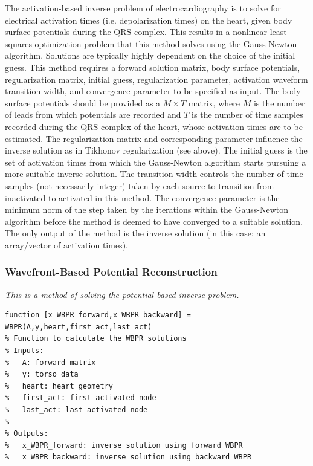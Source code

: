 The activation-based inverse problem of electrocardiography is to solve for electrical activation times (i.e. depolarization times) on the heart, given body surface potentials during the QRS complex. This results in a nonlinear least-squares optimization problem that this method solves using the Gauss-Newton algorithm. Solutions are typically highly dependent on the choice of the initial guess. This method requires a forward solution matrix, body surface potentials, regularization matrix, initial guess, regularization parameter, activation waveform transition width, and convergence parameter to be specified as input. The body surface potentials should be provided as a $M \times T$ matrix, where $M$ is the number of leads from which potentials are recorded and $T$ is the number of time samples recorded during the QRS complex of the heart, whose activation times are to be estimated. The regularization matrix and corresponding parameter influence the inverse solution as in Tikhonov regularization (see above). The initial guess is the set of activation times from which the Gauss-Newton algorithm starts pursuing a more suitable inverse solution. The transition width controls the number of time samples (not necessarily integer) taken by each source to transition from inactivated to activated in this method. The convergence parameter is the minimum norm of the step taken by the iterations within the Gauss-Newton algorithm before the method is deemed to have converged to a suitable solution. The only output of the method is the inverse solution (in this case: an array/vector of activation times).

\subsubsection{Wavefront-Based Potential Reconstruction}

\vspace{5pt}\textit{This is a method of solving the potential-based inverse problem.}\vspace{5pt}

\begin{verbatim}
function [x_WBPR_forward,x_WBPR_backward] = WBPR(A,y,heart,first_act,last_act)
% Function to calculate the WBPR solutions
% Inputs:
%   A: forward matrix
%   y: torso data
%   heart: heart geometry
%   first_act: first activated node
%   last_act: last activated node
%
% Outputs:
%   x_WBPR_forward: inverse solution using forward WBPR
%   x_WBPR_backward: inverse solution using backward WBPR
\end{verbatim}

